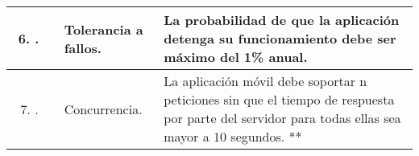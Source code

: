 \begin{longtable}{|M{1.6cm}|M{4.0cm}|M{6.0cm}|}
\begin{enumerate}[label=RNF\arabic*]
        \setcounter{enumi}{5}
 	    \item.
 	\end{enumerate}
 	& Tolerancia a fallos.
 	& La probabilidad de que la aplicación detenga su funcionamiento debe ser máximo del 1\% anual.  \\
    \hline
    \begin{enumerate}[label=RNF\arabic*]
        \setcounter{enumi}{6}
 	    \item.
 	\end{enumerate}
 	& Concurrencia.
 	& La aplicación móvil debe soportar n peticiones sin que el tiempo de respuesta por parte del servidor para todas ellas sea mayor a 10 segundos. ** \\
    \hline
\end{longtable}